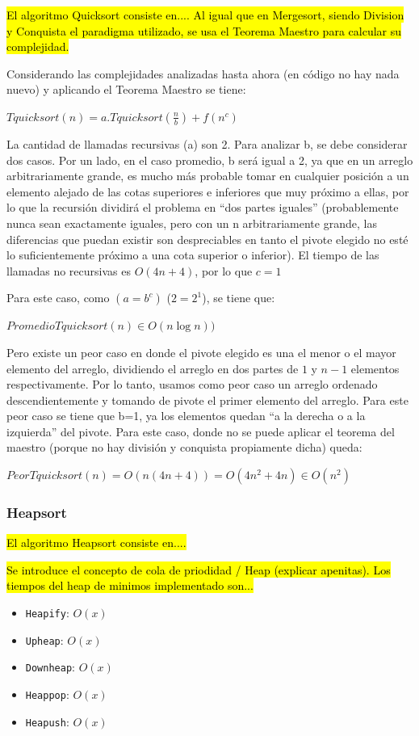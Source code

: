 \documentclass[article,a4paper]{article}
\begin{document}
\hl{El algoritmo Quicksort consiste en.... Al igual que en Mergesort, siendo Division y Conquista el paradigma utilizado, se usa el Teorema Maestro para calcular su complejidad.}

Considerando las complejidades analizadas hasta ahora (en código no hay nada nuevo) y aplicando el Teorema Maestro se tiene:

$Tquicksort(n) = a.Tquicksort(\frac{n}{b}) + f(n^c)$

La cantidad de llamadas recursivas (a) son 2. Para analizar b, se debe considerar dos casos. Por un lado, en el caso promedio, b será igual a 2, ya que en un arreglo arbitrariamente grande, es mucho más probable tomar en cualquier posición a un elemento alejado de las cotas superiores e inferiores que muy próximo a ellas, por lo que la recursión dividirá el problema en “dos partes iguales” (probablemente nunca sean exactamente iguales, pero con un n arbitrariamente grande, las diferencias que puedan existir son despreciables en tanto el pivote elegido no esté lo suficientemente próximo a una cota superior o inferior). El tiempo de las llamadas no recursivas es $O(4n + 4)$, por lo que $c=1$

Para este caso, como $(a = b^c)$ ($2 = 2^1$), se tiene que:

$PromedioTquicksort(n) \in O(n \log n))$

Pero existe un peor caso en donde el pivote elegido es una el menor o el mayor elemento del arreglo, dividiendo el arreglo en dos partes de $1$ y $n-1$ elementos respectivamente. Por lo tanto, usamos como peor caso un arreglo ordenado descendientemente y tomando de pivote el primer elemento del arreglo. Para este peor caso se tiene que b=1, ya los elementos quedan “a la derecha o a la izquierda” del pivote. Para este caso, donde no se puede aplicar el teorema del maestro (porque no hay división y conquista propiamente dicha) queda:

$PeorTquicksort(n) = O( n(4n + 4) ) =  O( 4n^2 + 4n) \in O(n^2)$

\subsubsection{Heapsort}

\hl{El algoritmo Heapsort consiste en.... }

\hl{Se introduce el concepto de cola de priodidad / Heap (explicar apenitas). Los tiempos del heap de minimos implementado son...}

\begin{itemize}
\item \texttt{Heapify}: $O(x)$
\item \texttt{Upheap}: $O(x)$
\item \texttt{Downheap}: $O(x)$
\item \texttt{Heappop}: $O(x)$
\item \texttt{Heapush}: $O(x)$
\end{itemize}
\end{document}
